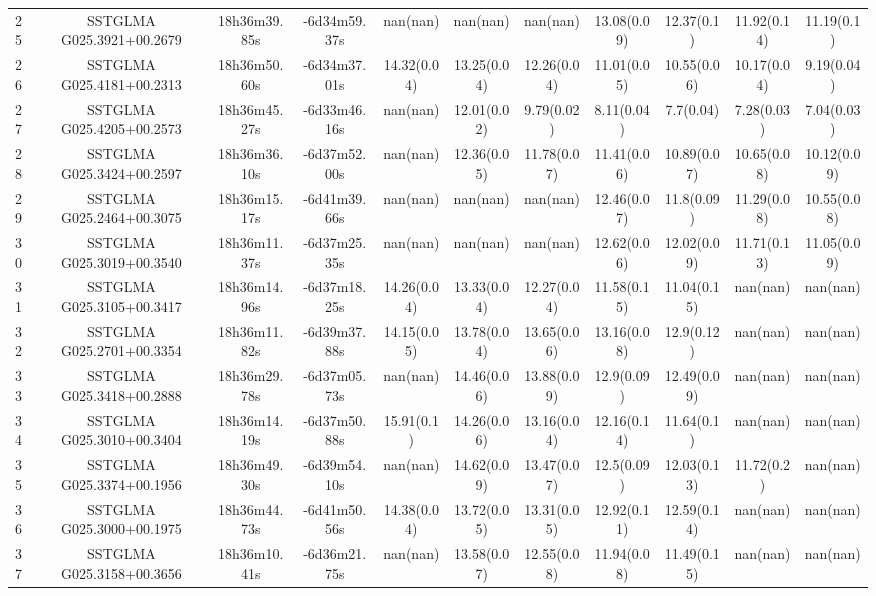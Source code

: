 \begin{table}
{{\begin{tabular}[c]{lcccccccccc}
25 & SSTGLMA G025.3921+00.2679 & 18h36m39.85s & -6d34m59.37s & nan(nan)    & nan(nan)    & nan(nan)    & 13.08(0.09) & 12.37(0.1)  & 11.92(0.14) & 11.19(0.1) \\
26 & SSTGLMA G025.4181+00.2313 & 18h36m50.60s & -6d34m37.01s & 14.32(0.04) & 13.25(0.04) & 12.26(0.04) & 11.01(0.05) & 10.55(0.06) & 10.17(0.04) & 9.19(0.04) \\
27 & SSTGLMA G025.4205+00.2573 & 18h36m45.27s & -6d33m46.16s & nan(nan)    & 12.01(0.02) & 9.79(0.02)  & 8.11(0.04)  & 7.7(0.04)   & 7.28(0.03)  & 7.04(0.03) \\
28 & SSTGLMA G025.3424+00.2597 & 18h36m36.10s & -6d37m52.00s & nan(nan)    & 12.36(0.05) & 11.78(0.07) & 11.41(0.06) & 10.89(0.07) & 10.65(0.08) & 10.12(0.09) \\
29 & SSTGLMA G025.2464+00.3075 & 18h36m15.17s & -6d41m39.66s & nan(nan)    & nan(nan)    & nan(nan)    & 12.46(0.07) & 11.8(0.09)  & 11.29(0.08) & 10.55(0.08) \\
30 & SSTGLMA G025.3019+00.3540 & 18h36m11.37s & -6d37m25.35s & nan(nan)    & nan(nan)    & nan(nan)    & 12.62(0.06) & 12.02(0.09) & 11.71(0.13) & 11.05(0.09) \\
31 & SSTGLMA G025.3105+00.3417 & 18h36m14.96s & -6d37m18.25s & 14.26(0.04) & 13.33(0.04) & 12.27(0.04) & 11.58(0.15) & 11.04(0.15) & nan(nan)    & nan(nan) \\
32 & SSTGLMA G025.2701+00.3354 & 18h36m11.82s & -6d39m37.88s & 14.15(0.05) & 13.78(0.04) & 13.65(0.06) & 13.16(0.08) & 12.9(0.12)  & nan(nan)    & nan(nan) \\
33 & SSTGLMA G025.3418+00.2888 & 18h36m29.78s & -6d37m05.73s & nan(nan)    & 14.46(0.06) & 13.88(0.09) & 12.9(0.09)  & 12.49(0.09) & nan(nan)    & nan(nan) \\
34 & SSTGLMA G025.3010+00.3404 & 18h36m14.19s & -6d37m50.88s & 15.91(0.1)  & 14.26(0.06) & 13.16(0.04) & 12.16(0.14) & 11.64(0.1)  & nan(nan)    & nan(nan) \\
35 & SSTGLMA G025.3374+00.1956 & 18h36m49.30s & -6d39m54.10s & nan(nan)    & 14.62(0.09) & 13.47(0.07) & 12.5(0.09)  & 12.03(0.13) & 11.72(0.2)  & nan(nan) \\
36 & SSTGLMA G025.3000+00.1975 & 18h36m44.73s & -6d41m50.56s & 14.38(0.04) & 13.72(0.05) & 13.31(0.05) & 12.92(0.11) & 12.59(0.14) & nan(nan)    & nan(nan) \\
37 & SSTGLMA G025.3158+00.3656 & 18h36m10.41s & -6d36m21.75s & nan(nan)    & 13.58(0.07) & 12.55(0.08) & 11.94(0.08) & 11.49(0.15) & nan(nan)    & nan(nan) \\

\end{tabular}}}
\end{table}
